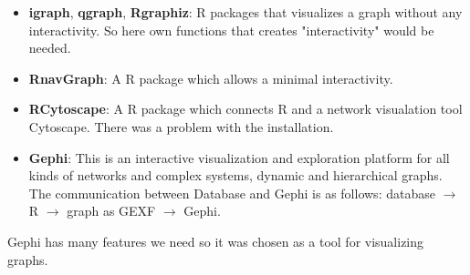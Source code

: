 \documentclass[a4paper]{article}
\begin{document}
\begin{itemize}
\item \textbf{igraph}, \textbf{qgraph}, \textbf{Rgraphiz}: R packages
  that visualizes a graph without any interactivity. So here own
  functions that creates "interactivity" would be needed.
\item \textbf{RnavGraph}: A R package which allows a minimal
  interactivity.
\item \textbf{RCytoscape}: A R package which connects R and a network
  visualation tool Cytoscape. There was a problem with the
  installation.
\item \textbf{Gephi}: This is an interactive visualization and
  exploration platform for all kinds of networks and complex systems,
  dynamic and hierarchical graphs. The communication between Database
  and Gephi is as follows: database $\rightarrow$ R $\rightarrow$
  graph as GEXF $\rightarrow$ Gephi.
\end{itemize}
Gephi has many features we need so it was chosen as a tool for
visualizing graphs.
\end{document}
